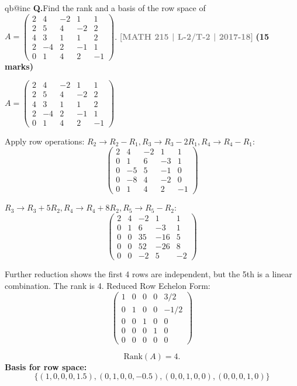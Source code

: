 \documentclass[12pt,a3paper]{article}
\makeatletter
\newcommand{\yr}[1]{\hfill\textcolor{gray}{\small\textbf{[#1]}}}
\newcommand{\mk}[1]{\textcolor{orange!70!black}{\small\textbf{(#1 marks)}}}
\newcounter{qnum}
\newcommand{\Q}[1]{%
  \csname qb@inc\endcsname
  \needspace{4\baselineskip}
  \refstepcounter{qnum}
  \vspace{6pt}
  \noindent\textbf{Q\theqnum.}\enspace #1\par
}
\makeatother
\begin{document}
\Q{Find the rank and a basis of the row space of $A = \begin{pmatrix} 2 & 4 & -2 & 1 & 1 \\ 2 & 5 & 4 & -2 & 2 \\ 4 & 3 & 1 & 1 & 2 \\ 2 & -4 & 2 & -1 & 1 \\ 0 & 1 & 4 & 2 & -1 \end{pmatrix}$.
\yr{MATH 215 | L-2/T-2 | 2017-18} \mk{15}}

\begin{tcolorbox}[enhanced,breakable,colback=cB!4,colframe=cB,
  boxrule=0.8pt,arc=5pt,
  title={\textbf{Answer --- Rank and Basis of Row Space}},
  fonttitle=\bfseries\color{white},colbacktitle=cB]

$A = \begin{pmatrix} 2 & 4 & -2 & 1 & 1 \\ 2 & 5 & 4 & -2 & 2 \\ 4 & 3 & 1 & 1 & 2 \\ 2 & -4 & 2 & -1 & 1 \\ 0 & 1 & 4 & 2 & -1 \end{pmatrix}$

Apply row operations:
$R_2 \to R_2 - R_1, R_3 \to R_3 - 2R_1, R_4 \to R_4 - R_1$:
\[ \begin{pmatrix} 2 & 4 & -2 & 1 & 1 \\ 0 & 1 & 6 & -3 & 1 \\ 0 & -5 & 5 & -1 & 0 \\ 0 & -8 & 4 & -2 & 0 \\ 0 & 1 & 4 & 2 & -1 \end{pmatrix} \]

$R_3 \to R_3 + 5R_2, R_4 \to R_4 + 8R_2, R_5 \to R_5 - R_2$:
\[ \begin{pmatrix} 2 & 4 & -2 & 1 & 1 \\ 0 & 1 & 6 & -3 & 1 \\ 0 & 0 & 35 & -16 & 5 \\ 0 & 0 & 52 & -26 & 8 \\ 0 & 0 & -2 & 5 & -2 \end{pmatrix} \]

Further reduction shows the first 4 rows are independent, but the 5th is a linear combination. The rank is 4.
Reduced Row Echelon Form:
\[ \begin{pmatrix} 1 & 0 & 0 & 0 & 3/2 \\ 0 & 1 & 0 & 0 & -1/2 \\ 0 & 0 & 1 & 0 & 0 \\ 0 & 0 & 0 & 1 & 0 \\ 0 & 0 & 0 & 0 & 0 \end{pmatrix} \]

\[ \boxed{\text{Rank}(A) = 4.} \]
\textbf{Basis for row space:}
\[ \boxed{\{(1, 0, 0, 0, 1.5), (0, 1, 0, 0, -0.5), (0, 0, 1, 0, 0), (0, 0, 0, 1, 0)\}} \]
\end{tcolorbox}
\end{document}
